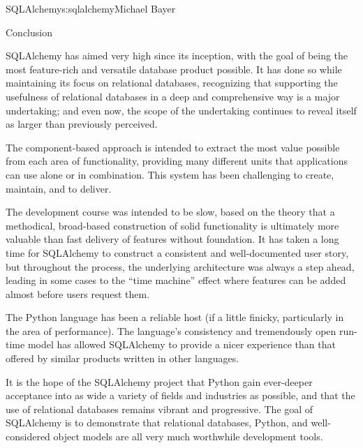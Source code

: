 \begin{aosachapter}{SQLAlchemy}{s:sqlalchemy}{Michael Bayer}
\begin{aosasect1}{Conclusion}

SQLAlchemy has aimed very high since its inception, with the goal of being
the most feature-rich and versatile database product possible.  It has done
so while maintaining its focus on relational databases, recognizing that
supporting the usefulness of relational databases in a deep and comprehensive way
is a major undertaking; and even now, the scope of the undertaking
continues to reveal itself as larger than previously perceived.

The component-based
approach is intended to extract the most value possible from each area
of functionality, providing many different units that applications can use alone
or in combination.  This system has been challenging to create, maintain,
and to deliver.

The development course was intended to be slow, based on the
theory that a methodical, broad-based construction of solid functionality is ultimately more valuable
than fast delivery of features without foundation.  It has taken a long time for SQLAlchemy to
construct
a consistent and well-documented user story, but throughout the process, the underlying architecture
was always a step ahead, leading in some cases to the ``time machine'' effect
where features can be added almost before users request them.

The Python language has been a reliable host (if
a little finicky, particularly in the area of performance).  The language's
consistency and tremendously open run-time model has allowed SQLAlchemy to provide a nicer
experience than that offered by similar products written in other languages.

It is the hope of the SQLAlchemy project that Python gain ever-deeper
acceptance into as wide a variety of fields and industries as possible, and
that the use of relational databases remains vibrant and progressive. The goal
of SQLAlchemy is to demonstrate that relational databases, Python, and
well-considered object models are all very much worthwhile development tools.

\end{aosasect1}

\end{aosachapter}
